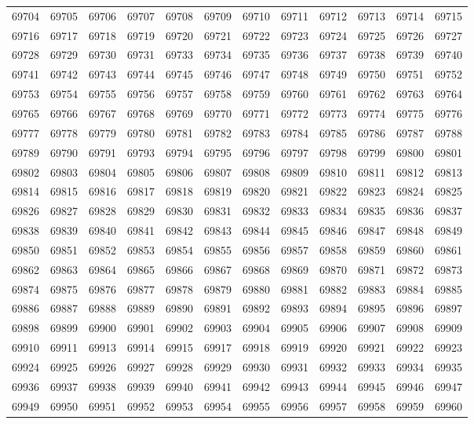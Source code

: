 \begin{center}
\begin{longtable}{llllllllllll}
69704 &69705 &69706 &69707 &69708 &69709 &69710 &69711 &69712 &69713 &69714 &69715 \\
69716 &69717 &69718 &69719 &69720 &69721 &69722 &69723 &69724 &69725 &69726 &69727 \\
69728 &69729 &69730 &69731 &69733 &69734 &69735 &69736 &69737 &69738 &69739 &69740 \\
69741 &69742 &69743 &69744 &69745 &69746 &69747 &69748 &69749 &69750 &69751 &69752 \\
69753 &69754 &69755 &69756 &69757 &69758 &69759 &69760 &69761 &69762 &69763 &69764 \\
69765 &69766 &69767 &69768 &69769 &69770 &69771 &69772 &69773 &69774 &69775 &69776 \\
69777 &69778 &69779 &69780 &69781 &69782 &69783 &69784 &69785 &69786 &69787 &69788 \\
69789 &69790 &69791 &69793 &69794 &69795 &69796 &69797 &69798 &69799 &69800 &69801 \\
69802 &69803 &69804 &69805 &69806 &69807 &69808 &69809 &69810 &69811 &69812 &69813 \\
69814 &69815 &69816 &69817 &69818 &69819 &69820 &69821 &69822 &69823 &69824 &69825 \\
69826 &69827 &69828 &69829 &69830 &69831 &69832 &69833 &69834 &69835 &69836 &69837 \\
69838 &69839 &69840 &69841 &69842 &69843 &69844 &69845 &69846 &69847 &69848 &69849 \\
69850 &69851 &69852 &69853 &69854 &69855 &69856 &69857 &69858 &69859 &69860 &69861 \\
69862 &69863 &69864 &69865 &69866 &69867 &69868 &69869 &69870 &69871 &69872 &69873 \\
69874 &69875 &69876 &69877 &69878 &69879 &69880 &69881 &69882 &69883 &69884 &69885 \\
69886 &69887 &69888 &69889 &69890 &69891 &69892 &69893 &69894 &69895 &69896 &69897 \\
69898 &69899 &69900 &69901 &69902 &69903 &69904 &69905 &69906 &69907 &69908 &69909 \\
69910 &69911 &69913 &69914 &69915 &69917 &69918 &69919 &69920 &69921 &69922 &69923 \\
69924 &69925 &69926 &69927 &69928 &69929 &69930 &69931 &69932 &69933 &69934 &69935 \\
69936 &69937 &69938 &69939 &69940 &69941 &69942 &69943 &69944 &69945 &69946 &69947 \\
69949 &69950 &69951 &69952 &69953 &69954 &69955 &69956 &69957 &69958 &69959 &69960 \\

\end{longtable}
\end{center}
